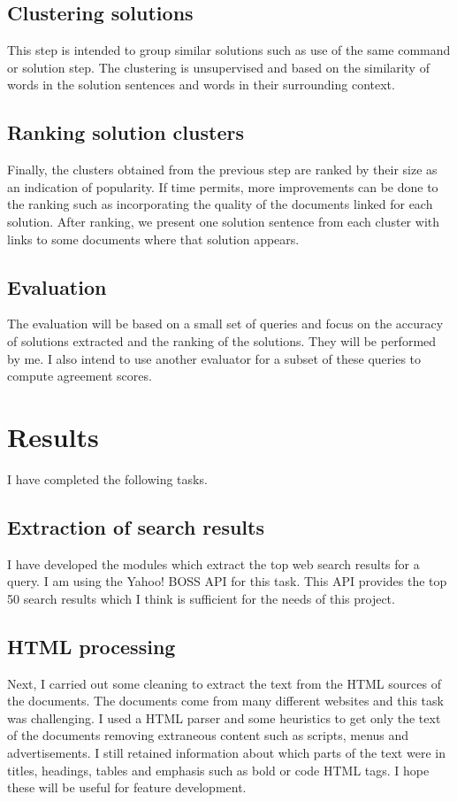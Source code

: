 \documentclass[11pt]{article}
\begin{document}
\subsection{Clustering solutions} This step is intended to group similar
solutions such as use of the same command or solution step. 
The clustering is unsupervised and based on the similarity of words 
in the solution sentences 
and words in their surrounding context. 

\subsection{Ranking solution clusters} Finally, the clusters obtained from the
previous step are ranked by their 
size as an indication of popularity. If time permits, more improvements can be done
to the ranking such as incorporating the quality of the documents linked for 
each solution. After ranking, we present one solution sentence from each cluster with
links to some documents where that solution appears.

\subsection{Evaluation}
The evaluation will be based on a small set of queries and focus on the accuracy of 
solutions extracted and the ranking of the solutions. They will be performed by me.
I also intend to use another evaluator for a subset of these queries 
to compute agreement scores.

\section{Results}

I have completed the following tasks.

\subsection{Extraction of search results}
I have developed the modules which extract the top web search results 
for a query. I am using the Yahoo! BOSS API for this task. This API provides
the top 50 search results which I think is sufficient for the needs of this
project. 

\subsection{HTML processing}
Next, I carried
out some cleaning to extract the text from the HTML sources of the documents.
The documents come from many different websites and this task was challenging.
I used a HTML parser and some heuristics to get only the text of the documents
removing extraneous content such as scripts, menus and advertisements. 
I still retained information about which parts of the text were in
titles, headings, tables and emphasis such as bold or code HTML tags. I hope these
will be useful for feature development. 
\end{document}

